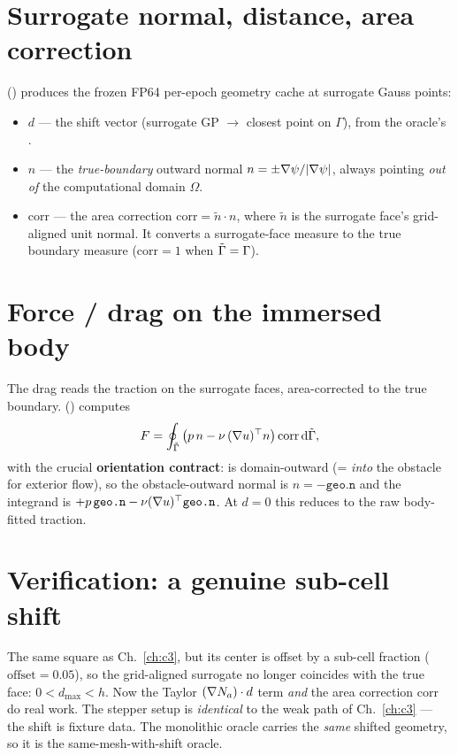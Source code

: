 \section{Surrogate normal, distance, area correction}
 () produces the
frozen FP64 per-epoch geometry cache at surrogate Gauss points:
\begin{itemize}
\item \textbf{$d$} --- the shift vector (surrogate GP $\to$ closest point on
  $\Gamma$), from the oracle's .
\item \textbf{$n$} --- the \emph{true-boundary} outward normal
  $n=\pm\nabla\psi/|\nabla\psi|$, always pointing \emph{out of} the
  computational domain $\Omega$.
\item \textbf{$\text{corr}$} --- the area correction
  $\text{corr}=\tilde n\cdot n$, where $\tilde n$ is the surrogate face's
  grid-aligned unit normal. It converts a surrogate-face measure to the true
  boundary measure ($\text{corr}=1$ when $\tilde\Gamma=\Gamma$).
\end{itemize}

\section{Force / drag on the immersed body}
The drag reads the traction on the surrogate faces, area-corrected to the
true boundary. 
() computes
\begin{equation}
F = \oint_{\tilde\Gamma}\big(p\,n - \nu\,(\nabla u)^\top n\big)\,\text{corr}\,\mathrm{d}\tilde\Gamma,
\end{equation}
with the crucial \textbf{orientation contract}:  is
domain-outward (= \emph{into} the obstacle for exterior flow), so the
obstacle-outward normal is $\hat n=-\texttt{geo.n}$ and the integrand is
$+p\,\texttt{geo.n}-\nu(\nabla u)^\top\texttt{geo.n}$. At $d=0$ this reduces to
the raw body-fitted traction.

\section{Verification: a genuine sub-cell shift}
The same square as Ch.~\ref{ch:c3}, but its center is offset by a sub-cell
fraction ($\text{offset}=0.05$), so the grid-aligned surrogate no longer
coincides with the true  face: $0<d_{\max}<h$. Now the Taylor
$(\nabla N_a)\cdot d$ term \emph{and} the area correction $\text{corr}$ do
real work. The stepper setup is \emph{identical} to the weak path of
Ch.~\ref{ch:c3} --- the shift is fixture data. The monolithic oracle carries
the \emph{same} shifted geometry, so it is the same-mesh-with-shift oracle.

